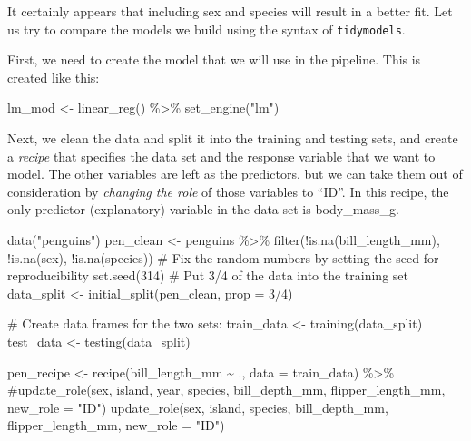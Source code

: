 \documentclass[
  letterpaper,
  DIV=11,
  numbers=noendperiod]{scrreprt}
\newenvironment{Shaded}{\begin{snugshade}}{\end{snugshade}}
\newcommand{\AttributeTok}[1]{\textcolor[rgb]{0.40,0.45,0.13}{#1}}
\newcommand{\CommentTok}[1]{\textcolor[rgb]{0.37,0.37,0.37}{#1}}
\newcommand{\DecValTok}[1]{\textcolor[rgb]{0.68,0.00,0.00}{#1}}
\newcommand{\FunctionTok}[1]{\textcolor[rgb]{0.28,0.35,0.67}{#1}}
\newcommand{\NormalTok}[1]{\textcolor[rgb]{0.00,0.23,0.31}{#1}}
\newcommand{\OtherTok}[1]{\textcolor[rgb]{0.00,0.23,0.31}{#1}}
\newcommand{\SpecialCharTok}[1]{\textcolor[rgb]{0.37,0.37,0.37}{#1}}
\newcommand{\StringTok}[1]{\textcolor[rgb]{0.13,0.47,0.30}{#1}}
\begin{document}
It certainly appears that including sex and species will result in a
better fit. Let us try to compare the models we build using the syntax
of \texttt{tidymodels}.

First, we need to create the model that we will use in the pipeline.
This is created like this:

\begin{Shaded}
\begin{Highlighting}[]
\NormalTok{lm\_mod }\OtherTok{\textless{}{-}} 
  \FunctionTok{linear\_reg}\NormalTok{() }\SpecialCharTok{\%\textgreater{}\%} 
  \FunctionTok{set\_engine}\NormalTok{(}\StringTok{"lm"}\NormalTok{)}
\end{Highlighting}
\end{Shaded}

Next, we clean the data and split it into the training and testing sets,
and create a \emph{recipe} that specifies the data set and the response
variable that we want to model. The other variables are left as the
predictors, but we can take them out of consideration by \emph{changing
the role} of those variables to ``ID''. In this recipe, the only
predictor (explanatory) variable in the data set is body\_mass\_g.

\begin{Shaded}
\begin{Highlighting}[]
\FunctionTok{data}\NormalTok{(}\StringTok{"penguins"}\NormalTok{)}
\NormalTok{pen\_clean }\OtherTok{\textless{}{-}}\NormalTok{ penguins }\SpecialCharTok{\%\textgreater{}\%} \FunctionTok{filter}\NormalTok{(}\SpecialCharTok{!}\FunctionTok{is.na}\NormalTok{(bill\_length\_mm), }\SpecialCharTok{!}\FunctionTok{is.na}\NormalTok{(sex), }\SpecialCharTok{!}\FunctionTok{is.na}\NormalTok{(species))}
\CommentTok{\# Fix the random numbers by setting the seed  for reproducibility}
\FunctionTok{set.seed}\NormalTok{(}\DecValTok{314}\NormalTok{)}
\CommentTok{\# Put 3/4 of the data into the training set }
\NormalTok{data\_split }\OtherTok{\textless{}{-}} \FunctionTok{initial\_split}\NormalTok{(pen\_clean, }\AttributeTok{prop =} \DecValTok{3}\SpecialCharTok{/}\DecValTok{4}\NormalTok{)}

\CommentTok{\# Create data frames for the two sets:}
\NormalTok{train\_data }\OtherTok{\textless{}{-}} \FunctionTok{training}\NormalTok{(data\_split)}
\NormalTok{test\_data  }\OtherTok{\textless{}{-}} \FunctionTok{testing}\NormalTok{(data\_split)}

\NormalTok{pen\_recipe }\OtherTok{\textless{}{-}} 
  \FunctionTok{recipe}\NormalTok{(bill\_length\_mm }\SpecialCharTok{\textasciitilde{}}\NormalTok{ ., }\AttributeTok{data =}\NormalTok{ train\_data) }\SpecialCharTok{\%\textgreater{}\%} 
  \CommentTok{\#update\_role(sex, island, year, species, bill\_depth\_mm, flipper\_length\_mm, new\_role = "ID")}
  \FunctionTok{update\_role}\NormalTok{(sex, island, species, bill\_depth\_mm, flipper\_length\_mm, }\AttributeTok{new\_role =} \StringTok{"ID"}\NormalTok{) }
\end{Highlighting}
\end{Shaded}
\end{document}
